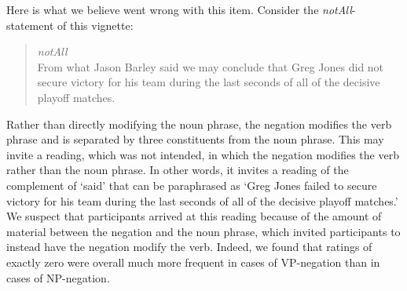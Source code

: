\documentclass[12pt]{article}
\begin{document}


Here is what we believe went wrong with this item. Consider the \emph{notAll}-statement of this
vignette:

\begin{quote} \emph{notAll} \\
  From what Jason Barley said we may conclude that Greg Jones did not secure victory for his
  team during the last seconds of all of the decisive playoff matches.
\end{quote}

\noindent Rather than directly modifying the noun phrase, the negation modifies the verb phrase
and is separated by three constituents from the noun phrase. This may invite a reading, which
was not intended, in which the negation modifies the verb rather than the noun phrase. In other
words, it invites a reading of the complement of `said' that can be paraphrased as `Greg Jones
failed to secure victory for his team during the last seconds of all of the decisive playoff
matches.' We suspect that participants arrived at this reading because of the amount of
material between the negation and the noun phrase, which invited participants to instead have
the negation modify the verb. Indeed, we found that ratings of exactly zero were overall much
more frequent in cases of VP-negation than in cases of NP-negation. 
\end{document}

